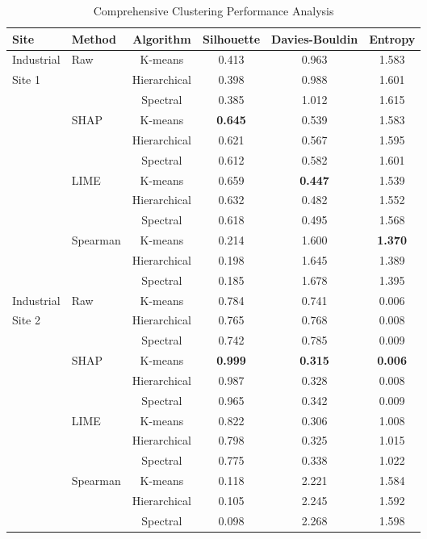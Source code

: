 \documentclass[final,5p,times,twocolumn,numbers]{elsarticle}
\begin{document}
\begin{table*}[t!]
\centering
\caption{Comprehensive Clustering Performance Analysis}
\label{tab:comprehensive_clustering}
\begin{tabular}{llcccc}
\hline
\textbf{Site} & \textbf{Method} & \textbf{Algorithm} & \textbf{Silhouette} & \textbf{Davies-Bouldin} & \textbf{Entropy} \\
\hline
Industrial & Raw & K-means & 0.413 & 0.963 & 1.583 \\
Site 1 & & Hierarchical & 0.398 & 0.988 & 1.601 \\
      & & Spectral & 0.385 & 1.012 & 1.615 \\
      & SHAP & K-means & \textbf{0.645} & 0.539 & 1.583 \\
      & & Hierarchical & 0.621 & 0.567 & 1.595 \\
      & & Spectral & 0.612 & 0.582 & 1.601 \\
      & LIME & K-means & 0.659 & \textbf{0.447} & 1.539 \\
      & & Hierarchical & 0.632 & 0.482 & 1.552 \\
      & & Spectral & 0.618 & 0.495 & 1.568 \\
      & Spearman & K-means & 0.214 & 1.600 & \textbf{1.370} \\
      & & Hierarchical & 0.198 & 1.645 & 1.389 \\
      & & Spectral & 0.185 & 1.678 & 1.395 \\
\hline
Industrial & Raw & K-means & 0.784 & 0.741 & 0.006 \\
Site 2 & & Hierarchical & 0.765 & 0.768 & 0.008 \\
      & & Spectral & 0.742 & 0.785 & 0.009 \\
      & SHAP & K-means & \textbf{0.999} & \textbf{0.315} & \textbf{0.006} \\
      & & Hierarchical & 0.987 & 0.328 & 0.008 \\
      & & Spectral & 0.965 & 0.342 & 0.009 \\
      & LIME & K-means & 0.822 & 0.306 & 1.008 \\
      & & Hierarchical & 0.798 & 0.325 & 1.015 \\
      & & Spectral & 0.775 & 0.338 & 1.022 \\
      & Spearman & K-means & 0.118 & 2.221 & 1.584 \\
      & & Hierarchical & 0.105 & 2.245 & 1.592 \\
      & & Spectral & 0.098 & 2.268 & 1.598 \\

\end{tabular}
\end{table*}
\end{document}
